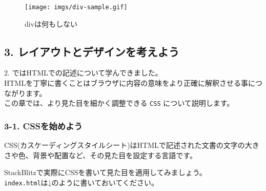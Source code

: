 \begin{figure}
\centering
\texttt{[image: imgs/div-sample.gif]}
\caption{divは何もしない}
\end{figure}

\subsection{3.
レイアウトとデザインを考えよう}\label{ux30ecux30a4ux30a2ux30a6ux30c8ux3068ux30c7ux30b6ux30a4ux30f3ux3092ux8003ux3048ux3088ux3046}

2. ではHTMLでの記述について学んできました。\\
HTMLを丁寧に書くことはブラウザに内容の意味をより正確に解釈させる事につながります。\\
この章では、より見た目を細かく調整できる \texttt{CSS}
について説明します。

\subsubsection{3-1.
CSSを始めよう}\label{cssux3092ux59cbux3081ux3088ux3046}

CSS(カスケーディングスタイルシート)はHTMLで記述された文書の文字の大きさや色、背景や配置など、その見た目を設定する言語です。

StackBlitzで実際にCSSを書いて見た目を適用してみましょう。\\
\texttt{index.html}は↓のように書いておいてください。

\begin{Shaded}
\begin{Highlighting}[]
\DataTypeTok{\textgreater{}}
\DataTypeTok{\textless{}}\OperatorTok{=}\DataTypeTok{\textgreater{}}
  \DataTypeTok{\textless{}}\DataTypeTok{\textgreater{}}
    \DataTypeTok{\textless{}}\OperatorTok{=}\OtherTok{ }\DataTypeTok{/\textgreater{}}
    \DataTypeTok{\textless{}}\OperatorTok{=}\OperatorTok{=}\OtherTok{ }\DataTypeTok{/\textgreater{}}
    \DataTypeTok{\textless{}}\DataTypeTok{\textgreater{}}\DataTypeTok{\textless{}/}\DataTypeTok{\textgreater{}}
  \DataTypeTok{\textless{}/}\DataTypeTok{\textgreater{}}
  \DataTypeTok{\textless{}}\DataTypeTok{\textgreater{}}
    \DataTypeTok{\textless{}}\DataTypeTok{\textgreater{}}\DataTypeTok{\textless{}/}\DataTypeTok{\textgreater{}}
  \DataTypeTok{\textless{}/}\DataTypeTok{\textgreater{}}
\DataTypeTok{\textless{}/}\DataTypeTok{\textgreater{}}
\end{Highlighting}
\end{Shaded}

